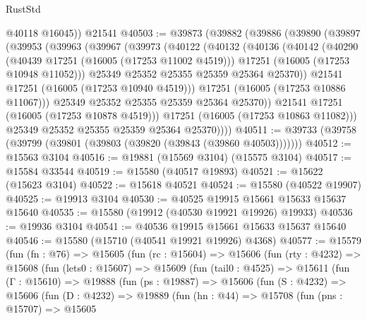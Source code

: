 \begin{lexlean}{RustStd}
\begin{coremodule}
        @40118
        @16045))
    @21541
@40503 := @39873
    (@39882
      (@39886
        (@39890
          (@39897
            (@39953
              (@39963
                (@39967
                  (@39973
                    (@40122
                      (@40132
                        (@40136
                          (@40142
                            (@40290
                              (@40439 @17251 (@16005 (@17253 @11002 @4519)))
                              @17251
                              (@16005 (@17253 @10948 @11052)))
                            @25349
                            @25352
                            @25355
                            @25359
                            @25364
                            @25370))
                        @21541
                        @17251
                        (@16005 (@17253 @10940 @4519)))
                      @17251
                      (@16005 (@17253 @10886 @11067)))
                    @25349
                    @25352
                    @25355
                    @25359
                    @25364
                    @25370))
                @21541
                @17251
                (@16005 (@17253 @10878 @4519)))
              @17251
              (@16005 (@17253 @10863 @11082)))
            @25349
            @25352
            @25355
            @25359
            @25364
            @25370))))
@40511 := @39733 (@39758 (@39799 (@39801 (@39803 (@39820 (@39843 (@39860 @40503)))))))
@40512 := @15563 @3104
@40516 := @19881 (@15569 @3104) (@15575 @3104)
@40517 := @15584 @33544
@40519 := @15580 (@40517 @19893)
@40521 := @15622 (@15623 @3104)
@40522 := @15618 @40521
@40524 := @15580 (@40522 @19907)
@40525 := @19913 @3104
@40530 := @40525 @19915 @15661 @15633 @15637 @15640
@40535 := @15580 (@19912 (@40530 @19921 @19926) @19933)
@40536 := @19936 @3104
@40541 := @40536 @19915 @15661 @15633 @15637 @15640
@40546 := @15580 (@15710 (@40541 @19921 @19926) @4368)
@40577 := @15579
    (fun (fn : @76) =>
    @15605
      (fun (rc : @15604) =>
      @15606
        (fun (rty : @4232) =>
        @15608
          (fun (lets0 : @15607) =>
          @15609
            (fun (tail0 : @4525) =>
            @15611
              (fun (Γ : @15610) =>
              @19888
                (fun (ps : @19887) =>
                @15606
                  (fun (S : @4232) =>
                  @15606
                    (fun (D : @4232) =>
                    @19889
                      (fun (hn : @44) =>
                      @15708
                        (fun (pns : @15707) =>
                        @15605

\end{coremodule}
\end{lexlean}
